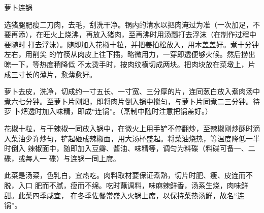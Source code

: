 \begin{recipe}{萝卜连锅}

\ingredients


\preparation

\step 选猪腿肥瘦二刀肉，去毛，刮洗干净。锅内的清水以把肉淹过为准（一次加足，不
要再添），在旺火上烧沸，再放入猪肉，至再沸时用汤瓢打去浮沫（在制作过程中要随时
打去浮沫）。随即加入花椒十粒，并把姜拍松放入，用木盖盖好。煮十分钟左右，用削尖
的竹筷从肉皮上往下插，略微用力，一穿即透便够火候。然后捞出晾一下，等热度稍降低
不太烫手时，按肉纹横切成两块。把肉块放在菜墩上，片成三寸长的薄片，愈薄愈好。

\step 萝卜去皮，洗净，切成约一寸五长、一寸宽、三分厚的片，连同葱白放入煮肉汤中
煮六七分钟。至萝卜片刚𤆵，即将肉片倒入锅中搅匀，与萝卜片同煮二三分钟。待萝
卜𤆵透时加入味精，即成“连锅”。（烹制中随时注意把锅盖好。）

\step 花椒十粒，与干辣椒一同放入锅中，在微火上用手铲不停翻炒，至辣椒刚炒酥时滴
入菜油少许炒匀，铲起砸成辣椒面，用大汤杯盛起。将菜油烧热，等温度降低一半时倒入
辣椒面中，随即加入豆瓣、酱油、味精等，调匀为料碟（料碟可备一、二碟，或每人一
碟）与连锅一同上席。

\features

此菜是汤菜，色乳白，宜热吃。肉料取材要保证煮熟，切片时肥、瘦、皮连而不脱，入口
肥而不腻，瘦而不绵。吃时蘸调料，味麻辣鲜香，汤系生烧，肉味鲜甜。此菜四季咸宜，
在冬季佐餐常盛入火锅上席，以保持菜热汤鲜，故名“连锅”。

\end{recipe}

